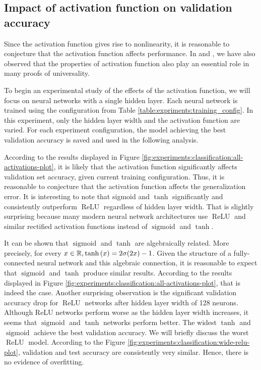 \subsection{Impact of activation function on validation accuracy}
\label{subsection:experiments:classification:activation}
Since the activation function gives rise to nonlinearity, it is reasonable to conjecture that the activation function affects performance. In  and , we have also observed that the properties of activation function also play an essential role in many proofs of universality.

To begin an experimental study of the effects of the activation function, we will focus on neural networks with a single hidden layer. Each neural network is trained using the configuration from Table \ref{table:expriments:training_config}. In this experiment, only the hidden layer width and the activation function are varied. For each experiment configuration, the model achieving the best validation accuracy is saved and used in the following analysis.

According to the results displayed in Figure \ref{fig:experiments:classification:all-activations-plot}, it is likely that the activation function significantly affects validation set accuracy, given current training configuration. Thus, it is reasonable to conjecture that the activation function affects the generalization error. It is interesting to note that sigmoid and $\tanh$ significantly and consistently outperform $\operatorname{ReLU}$ regardless of hidden layer width. That is slightly surprising because many modern neural network architectures use $\operatorname{ReLU}$ and similar rectified activation functions instead of $\operatorname{sigmoid}$ and $\tanh$.

It can be shown that $\operatorname{sigmoid}$  and $\tanh$ are algebraically related. More precisely, for every $x \in {\mathbb R}, \tanh{(x)} = 2\sigma(2x) - 1$. Given the structure of a fully-connected neural network and this algebraic connection, it is reasonable to expect that $\operatorname{sigmoid}$  and $\tanh$ produce similar results. According to the results displayed in Figure \ref{fig:experiments:classification:all-activations-plot}, that is indeed the case. Another surprising observation is the significant validation accuracy drop for $\operatorname{ReLU}$ networks after hidden layer width of 128 neurons. Although ReLU networks perform worse as the hidden layer width increases, it seems that $\operatorname{sigmoid}$ and $\tanh$ networks perform better. The widest $\tanh$ and $\operatorname{sigmoid}$ achieve the best validation accuracy. We will briefly discuss the worst $\operatorname{ReLU}$ model. According to the Figure \ref{fig:experiments:classification:wide-relu-plot}, validation and test accuracy are consistently very similar. Hence, there is no evidence of overfitting.

